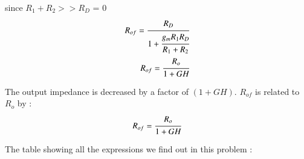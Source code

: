 \begin{enumerate}[label=\thesubsection.\arabic*.,ref=\thesubsection.\theenumi]
since $R_{1}+R_{2}>>R_{D}$ \implies {} = 0\\

\begin{align}
R_{of} = \cfrac{R_{D}}{1 + \cfrac{ g_{m}R_{1}R_{D}}{R_{1}+R_{2}}}\\
R_{of} = \cfrac{R_{o}}{1 + GH}
\end{align}

The output impedance is decreased by a factor of $(1+GH)$.
$R_{of}$ is related to $R_{o}$ by :\\
\begin{align}
R_{of} = \cfrac{R_{o}}{1 + GH}
\end{align}


The table showing all the expressions we find out in this problem :

\begin{table}[!ht]
\centering

\caption{}
\label{table}
\end{table}


\end{enumerate}
